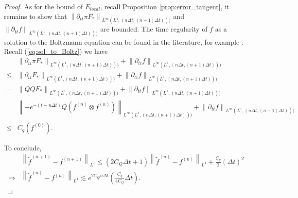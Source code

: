 \documentclass{article}
\numberwithin{equation}{section}
\begin{document}
\begin{proof}
    As for the bound of $E_{local}$, recall Proposition \ref{prop:error_tangent}, it remains to show that $\left\lVert \partial_{tt}\pi F_{*}\right\rVert_{L^{\infty}(L^{1},(n\Delta t, (n+1)\Delta t)))} $ and $\left\lVert \partial_{tt} f \right\rVert_{L^{\infty}(L^{1},(n\Delta t, (n+1)\Delta t)))} $ are bounded. The time regularity of $f$ as a solution to the Boltzmann equation can be found in the literature, for example \cite{desvillettes2000spatially}. Recall (\ref{eq:sol_to_Boltz}) we have
    \begin{equation*}
        \begin{split}
            &\left\lVert \partial_{tt}\pi F_{*}\right\rVert_{L^{\infty}(L^{1},(n\Delta t, (n+1)\Delta t)))} + \left\lVert \partial_{tt}f\right\rVert_{L^{\infty}(L^{1},(n\Delta t, (n+1)\Delta t)))} \\
            \leq& \left\lVert \partial_{tt} F_{*}\right\rVert_{L^{\infty}(L^{1},(n\Delta t, (n+1)\Delta t)))} + \left\lVert \partial_{tt}f\right\rVert_{L^{\infty}(L^{1},(n\Delta t, (n+1)\Delta t)))}\\
            =&\left\lVert QQ F_{*}\right\rVert_{L^{\infty}(L^{1},(n\Delta t, (n+1)\Delta t)))} + \left\lVert \partial_{tt}f\right\rVert_{L^{\infty}(L^{1},(n\Delta t, (n+1)\Delta t)))}\\
            =& \left\lVert -e^{-(t-n\Delta t)} Q\left(f^{(n)}\otimes f^{(n)}\right)\right\rVert_{L^{\infty}(L^{1},(n\Delta t, (n+1)\Delta t)))} + \left\lVert \partial_{tt}f\right\rVert_{L^{\infty}(L^{1},(n\Delta t, (n+1)\Delta t)))}\\
            \leq & C_{q}(f^{(0)}).
        \end{split}
    \end{equation*}

    To conclude,
    \begin{equation*}
        \begin{split}
            &\left\lVert \widetilde{f}^{(n+1)} - f^{(n+1)}\right\rVert_{L^{1}} \leq \left(2 C_{Q}\Delta t  + 1\right)\left\lVert \widetilde{f}^{(n)} - f^{(n)}\right\rVert_{L^{1}} + \frac{C_{q}}{2} (\Delta t)^{2}\\
            \Rightarrow & \left\lVert \widetilde{f}^{(n)} - f^{(n)}\right\rVert_{L^{1}} \lesssim e^{2C_{Q}n\Delta t}\left(\frac{C_{q}}{4C_{Q}}\Delta t \right).
        \end{split}
    \end{equation*}
\end{proof}
\end{document}
